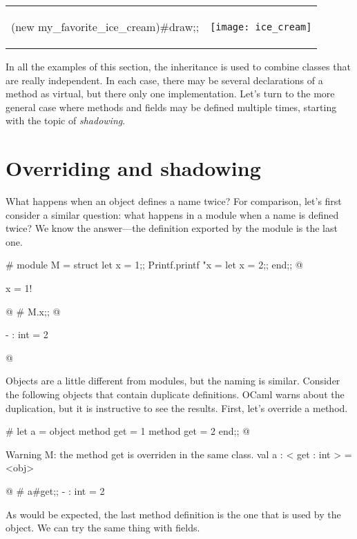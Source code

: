 \begin{center}
\begin{tabular}{ll}
\begin{minipage}[b]{2in}
\begin{ocamllisting}
(new my_favorite_ice_cream)#draw;;
\end{ocamllisting}
\end{minipage}
&
\texttt{[image: ice\_cream]}
\end{tabular}
\end{center}
%
In all the examples of this section, the inheritance is used to combine classes that are
really independent.  In each case, there may be several declarations of a method as virtual, but there only
one implementation.  Let's turn to the more general case where methods and fields may be defined
multiple times, starting with the topic of \emph{shadowing}.

\section{Overriding and shadowing}

What happens when an object defines a name twice?  For comparison, let's first consider a similar
question: what happens in a module when a name is defined twice?  We know the answer---the
definition exported by the module is the last one.

\begin{ocaml}
# module M =
  struct
     let x = 1;;
     Printf.printf "x = %
     let x = 2;;
  end;;
@
\begin{topoutput}
x = 1!
\end{topoutput}
@
# M.x;;
@
\begin{topoutput}
- : int = 2
\end{topoutput}
@
\end{ocaml}
%
Objects are a little different from modules, but the naming is similar.  Consider the following
objects that contain duplicate definitions.  OCaml warns about the duplication, but it is
instructive to see the results.  First, let's override a method.

\begin{ocaml}
# let a =
  object
     method get = 1
     method get = 2
  end;;
@
\begin{topoutput}
Warning M: the method get is overriden in the same class.
val a : < get : int > = <obj>
\end{topoutput}
@
# a#get;;
- : int = 2
\end{ocaml}
%
As would be expected, the last method definition is the one that is used by the object.
We can try the same thing with fields.

